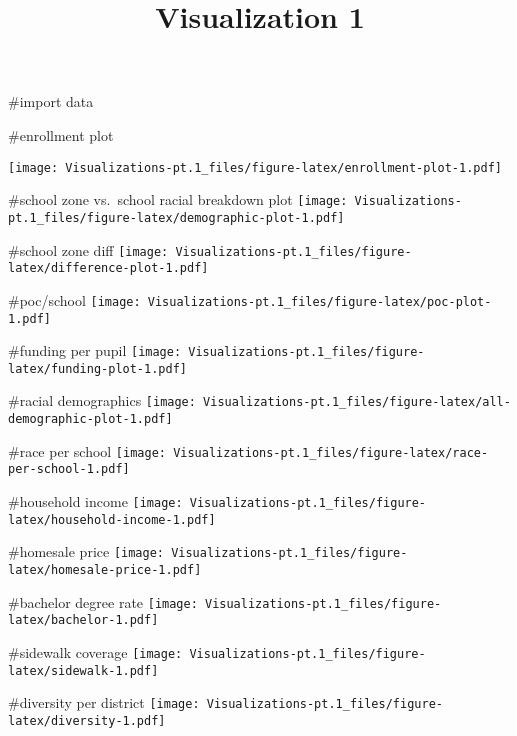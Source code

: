 \documentclass[
]{article}
\title{Visualization 1}
\author{}
\date{\vspace{-2.5em}}
\begin{document}
\maketitle

\#import data

\#enrollment plot

\texttt{[image: Visualizations-pt.1\_files/figure-latex/enrollment-plot-1.pdf]}

\#school zone vs.~school racial breakdown plot
\texttt{[image: Visualizations-pt.1\_files/figure-latex/demographic-plot-1.pdf]}

\#school zone diff
\texttt{[image: Visualizations-pt.1\_files/figure-latex/difference-plot-1.pdf]}

\#poc/school
\texttt{[image: Visualizations-pt.1\_files/figure-latex/poc-plot-1.pdf]}

\#funding per pupil
\texttt{[image: Visualizations-pt.1\_files/figure-latex/funding-plot-1.pdf]}

\#racial demographics
\texttt{[image: Visualizations-pt.1\_files/figure-latex/all-demographic-plot-1.pdf]}

\#race per school
\texttt{[image: Visualizations-pt.1\_files/figure-latex/race-per-school-1.pdf]}

\#household income
\texttt{[image: Visualizations-pt.1\_files/figure-latex/household-income-1.pdf]}

\#homesale price
\texttt{[image: Visualizations-pt.1\_files/figure-latex/homesale-price-1.pdf]}

\#bachelor degree rate
\texttt{[image: Visualizations-pt.1\_files/figure-latex/bachelor-1.pdf]}

\#sidewalk coverage
\texttt{[image: Visualizations-pt.1\_files/figure-latex/sidewalk-1.pdf]}

\#diversity per district
\texttt{[image: Visualizations-pt.1\_files/figure-latex/diversity-1.pdf]}
\end{document}
